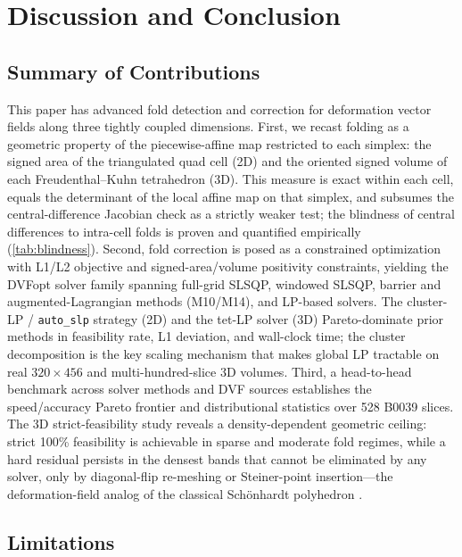 \section{Discussion and Conclusion}
\label{sec:conclusion}

\subsection{Summary of Contributions}
\label{sec:summary}

This paper has advanced fold detection and correction for deformation vector fields along three tightly coupled dimensions. First, we recast folding as a geometric property of the piecewise-affine map restricted to each simplex: the signed area of the triangulated quad cell (2D) and the oriented signed volume of each Freudenthal--Kuhn tetrahedron (3D). This measure is exact within each cell, equals the determinant of the local affine map on that simplex, and subsumes the central-difference Jacobian check as a strictly weaker test; the blindness of central differences to intra-cell folds is proven and quantified empirically (\autoref{tab:blindness}). Second, fold correction is posed as a constrained optimization with L1/L2 objective and signed-area/volume positivity constraints, yielding the DVFopt solver family spanning full-grid SLSQP, windowed SLSQP, barrier and augmented-Lagrangian methods (M10/M14), and LP-based solvers. The cluster-LP / \texttt{auto\_slp} strategy (2D) and the tet-LP solver (3D) Pareto-dominate prior methods in feasibility rate, L1 deviation, and wall-clock time; the cluster decomposition is the key scaling mechanism that makes global LP tractable on real $320\times456$ and multi-hundred-slice 3D volumes. Third, a head-to-head benchmark across solver methods and DVF sources establishes the speed/accuracy Pareto frontier and distributional statistics over 528 B0039 slices. The 3D strict-feasibility study reveals a density-dependent geometric ceiling: strict 100\% feasibility is achievable in sparse and moderate fold regimes, while a hard residual persists in the densest bands that cannot be eliminated by any solver, only by diagonal-flip re-meshing or Steiner-point insertion---the deformation-field analog of the classical Sch{\"o}nhardt polyhedron \cite{schonhardt1928}.

\subsection{Limitations}
\label{sec:limitations}

